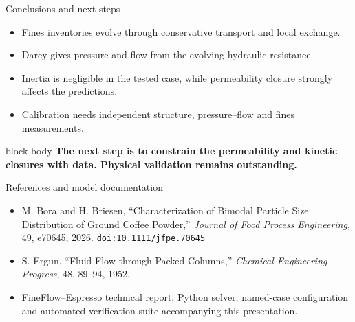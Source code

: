 \documentclass[aspectratio=169,11pt]{beamer}
\newcommand{\takeaway}[1]{%
  \begin{beamercolorbox}[rounded=true,sep=.55em]{block body}
    \centering\color{tumdark}\textbf{#1}
  \end{beamercolorbox}}
\begin{document}
\begin{frame}{Conclusions and next steps}
\begin{itemize}
\setlength{\itemsep}{.65em}
\item Fines inventories evolve through conservative transport and local exchange.
\item Darcy gives pressure and flow from the evolving hydraulic resistance.
\item Inertia is negligible in the tested case, while permeability closure strongly affects the predictions.
\item Calibration needs independent structure, pressure--flow and fines measurements.
\end{itemize}
\medskip
\takeaway{The next step is to constrain the permeability and kinetic closures with data. Physical validation remains outstanding.}
\end{frame}

\begin{frame}{References and model documentation}
 \small
 \begin{itemize}
  \item M. Bora and H. Briesen, ``Characterization of Bimodal Particle Size Distribution of Ground Coffee Powder,'' \emph{Journal of Food Process Engineering}, 49, e70645, 2026. \texttt{doi:10.1111/jfpe.70645}
  \item S. Ergun, ``Fluid Flow through Packed Columns,'' \emph{Chemical Engineering Progress}, 48, 89--94, 1952.
  \item FineFlow--Espresso technical report, Python solver, named-case configuration and automated verification suite accompanying this presentation.
 \end{itemize}
\end{frame}
\end{document}
